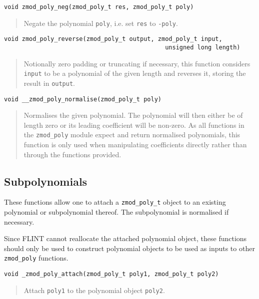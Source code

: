 \documentclass[a4paper,10pt]{article}
\newcommand{\code}{\lstinline}
\begin{document}
\begin{lstlisting}
void zmod_poly_neg(zmod_poly_t res, zmod_poly_t poly)
\end{lstlisting}
\begin{quote}
Negate the polynomial \code{poly}, i.e. set \code{res} to \code{-poly}.
\end{quote}

\begin{lstlisting}
void zmod_poly_reverse(zmod_poly_t output, zmod_poly_t input,
                                             unsigned long length)
\end{lstlisting}
\begin{quote}
Notionally zero padding or truncating if necessary, this function considers \code{input} to be a polynomial of the given length and reverses it, storing the result in \code{output}.
\end{quote}

\begin{lstlisting}
void __zmod_poly_normalise(zmod_poly_t poly)
\end{lstlisting}
\begin{quote}
Normalises the given polynomial. The polynomial will then either be of length zero or its leading coefficient will be non-zero. As all functions in the \code{zmod_poly} module expect and return normalised polynomials, this function is only used when manipulating coefficients directly rather than through the functions provided.
\end{quote}

\subsection{Subpolynomials}
These functions allow one to attach a \code{zmod_poly_t} object to an existing polynomial or subpolynomial thereof. The subpolynomial is normalised if necessary.

Since FLINT cannot reallocate the attached polynomial object, these functions should only be used to construct polynomial objects to be used as inputs to other \code{zmod_poly} functions.

\begin{lstlisting}
void _zmod_poly_attach(zmod_poly_t poly1, zmod_poly_t poly2)
\end{lstlisting}
\begin{quote}
Attach \code{poly1} to the polynomial object \code{poly2}.
\end{quote}
\end{document}
